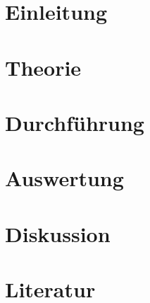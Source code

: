 \documentclass[12pt, a4paper, twoside]{scrartcl}
\begin{document}

\cleardoublepage
\tableofcontents
\cleardoublepage
\setcounter{page}{1}

\section{Einleitung}


\section{Theorie}
\label{sec:theorie}


\section{Durchführung}
\label{sec:durchfuehrung}


\section{Auswertung}
\label{sec:auswertung}

\section{Diskussion}
\label{sec:diskussion}

\section*{Literatur}
\end{document}
